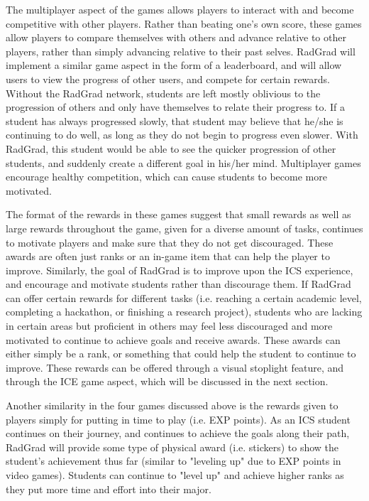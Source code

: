 The multiplayer aspect of the games allows players to interact with and become competitive with other players. Rather than beating one's own score, these games allow players to compare themselves with others and advance relative to other players, rather than simply advancing relative to their past selves. RadGrad will implement a similar game aspect in the form of a leaderboard, and will allow users to view the progress of other users, and compete for certain rewards. Without the RadGrad network, students are left mostly oblivious to the progression of others and only have themselves to relate their progress to. If a student has always progressed slowly, that student may believe that he/she is continuing to do well, as long as they do not begin to progress even slower. With RadGrad, this student would be able to see the quicker progression of other students, and suddenly create a different goal in his/her mind. Multiplayer games encourage healthy competition, which can cause students to become more motivated.   

The format of the rewards in these games suggest that small rewards as well as large rewards throughout the game, given for a diverse amount of tasks, continues to motivate players and make sure that they do not get discouraged. These awards are often just ranks or an in-game item that can help the player to improve. Similarly, the goal of RadGrad is to improve upon the ICS experience, and encourage and motivate students rather than discourage them. If RadGrad can offer certain rewards for different tasks (i.e. reaching a certain academic level, completing a hackathon, or finishing a research project), students who are lacking in certain areas but proficient in others may feel less discouraged and more motivated to continue to achieve goals and receive awards. These awards can either simply be a rank, or something that could help the student to continue to improve. These rewards can be offered through a visual stoplight feature, and through the ICE game aspect, which will be discussed in the next section. 

Another similarity in the four games discussed above is the rewards given to players simply for putting in time to play (i.e. EXP points). As an ICS student continues on their journey, and continues to achieve the goals along their path, RadGrad will provide some type of physical award (i.e. stickers) to show the student's achievement thus far (similar to "leveling up" due to EXP points in video games). Students can continue to "level up" and achieve higher ranks as they put more time and effort into their major.

